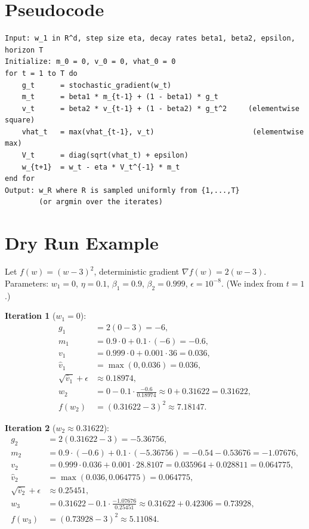 \documentclass[11pt]{article}
\begin{document}
\section*{Pseudocode}

\begin{verbatim}
Input: w_1 in R^d, step size eta, decay rates beta1, beta2, epsilon, horizon T
Initialize: m_0 = 0, v_0 = 0, vhat_0 = 0
for t = 1 to T do
    g_t      = stochastic_gradient(w_t)
    m_t      = beta1 * m_{t-1} + (1 - beta1) * g_t
    v_t      = beta2 * v_{t-1} + (1 - beta2) * g_t^2     (elementwise square)
    vhat_t   = max(vhat_{t-1}, v_t)                       (elementwise max)
    V_t      = diag(sqrt(vhat_t) + epsilon)
    w_{t+1}  = w_t - eta * V_t^{-1} * m_t
end for
Output: w_R where R is sampled uniformly from {1,...,T}
        (or argmin over the iterates)
\end{verbatim}

\section*{Dry Run Example}

Let $f(w) = (w-3)^2$, deterministic gradient $\nabla f(w) = 2(w-3)$.
Parameters: $w_1 = 0$, $\eta = 0.1$, $\beta_1 = 0.9$, $\beta_2 = 0.999$,
$\epsilon = 10^{-8}$. (We index from $t=1$.)

\textbf{Iteration 1} ($w_1 = 0$):
\begin{align*}
g_1 &= 2(0-3) = -6,\\
m_1 &= 0.9\cdot 0 + 0.1\cdot(-6) = -0.6,\\
v_1 &= 0.999\cdot 0 + 0.001\cdot 36 = 0.036,\\
\hat v_1 &= \max(0, 0.036) = 0.036,\\
\sqrt{\hat v_1}+\epsilon &\approx 0.18974,\\
w_2 &= 0 - 0.1\cdot\frac{-0.6}{0.18974} \approx 0 + 0.31622 = 0.31622,\\
f(w_2) &= (0.31622-3)^2 \approx 7.18147.
\end{align*}

\textbf{Iteration 2} ($w_2 \approx 0.31622$):
\begin{align*}
g_2 &= 2(0.31622-3) = -5.36756,\\
m_2 &= 0.9\cdot(-0.6) + 0.1\cdot(-5.36756) = -0.54 - 0.53676 = -1.07676,\\
v_2 &= 0.999\cdot 0.036 + 0.001\cdot 28.8107 = 0.035964 + 0.028811 = 0.064775,\\
\hat v_2 &= \max(0.036, 0.064775) = 0.064775,\\
\sqrt{\hat v_2}+\epsilon &\approx 0.25451,\\
w_3 &= 0.31622 - 0.1\cdot\frac{-1.07676}{0.25451} \approx 0.31622 + 0.42306 = 0.73928,\\
f(w_3) &= (0.73928-3)^2 \approx 5.11084.
\end{align*}
\end{document}
